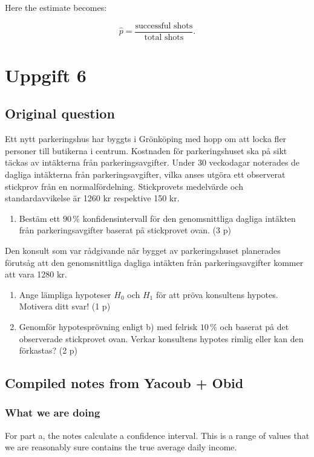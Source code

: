 \documentclass[10pt]{article}
\begin{document}
Here the estimate becomes:

\[
\hat p
=
\frac{\text{successful shots}}
{\text{total shots}}.
\]

\section*{Uppgift 6}

\subsection*{Original question}
Ett nytt parkeringshus har byggts i Grönköping med hopp om att locka
fler personer till butikerna i centrum. Kostnaden för parkeringshuset
ska på sikt täckas av intäkterna från parkeringsavgifter. Under
30 veckodagar noterades de dagliga intäkterna från parkeringsavgifter,
vilka anses utgöra ett observerat stickprov från en normalfördelning.
Stickprovets medelvärde och standardavvikelse är 1260 kr respektive
150 kr.

\begin{enumerate}[label=\alph*)]
\item
Bestäm ett $90\,\%$ konfidensintervall för den genomsnittliga dagliga
intäkten från parkeringsavgifter baserat på stickprovet ovan.
\hfill (3 p)
\end{enumerate}

Den konsult som var rådgivande när bygget av parkeringshuset
planerades förutsåg att den genomsnittliga dagliga intäkten från
parkeringsavgifter kommer att vara 1280 kr.

\begin{enumerate}[label=\alph*),resume]
\item
Ange lämpliga hypoteser $H_0$ och $H_1$ för att pröva konsultens
hypotes. Motivera ditt svar!
\hfill (1 p)

\item
Genomför hypotesprövning enligt b) med felrisk $10\,\%$ och baserat
på det observerade stickprovet ovan. Verkar konsultens hypotes rimlig
eller kan den förkastas?
\hfill (2 p)
\end{enumerate}

\subsection*{Compiled notes from Yacoub + Obid}

\subsubsection*{What we are doing}
For part a, the notes calculate a confidence interval.
This is a range of values that we are reasonably sure contains
the true average daily income.
\end{document}
